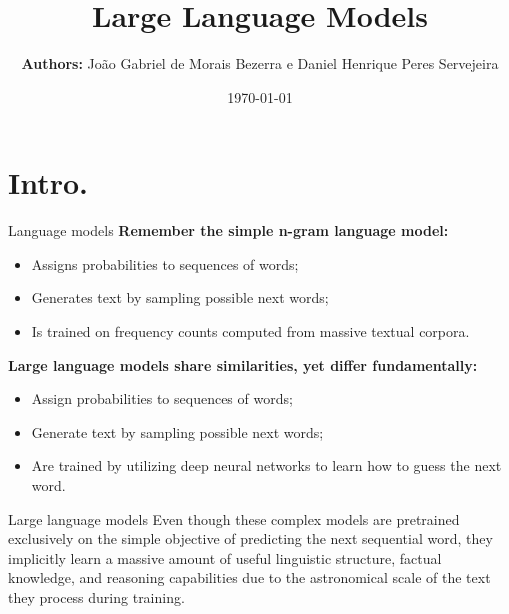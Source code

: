 \documentclass[aspectratio=169]{beamer}
\title[]{Large Language Models}
\author[Exame de Qualificação]{\textbf{Authors:} João Gabriel de Morais Bezerra e Daniel Henrique Peres Servejeira}%
\institute[]{Numerical Simulations and Artificial Intelligence Laboratory}
\date{\today}
\begin{document}
\begin{frame}
    \titlepage{}
\end{frame}
\section{Intro.}

\begin{frame}{Language models}\justifying
    \textbf{Remember the simple n-gram language model:}
    \begin{itemize}
        \item Assigns probabilities to sequences of words;
        \item Generates text by sampling possible next words;
        \item Is trained on frequency counts computed from massive textual corpora.
    \end{itemize}
    \vspace{0.5cm}
    \textbf{Large language models share similarities, yet differ fundamentally:}
    \begin{itemize}
        \item Assign probabilities to sequences of words;
        \item Generate text by sampling possible next words;
        \item Are trained by utilizing deep neural networks to learn how to guess the next word.
    \end{itemize}
\end{frame}

\begin{frame}{Large language models}\justifying
    Even though these complex models are pretrained exclusively on the simple objective of predicting the next sequential word, they implicitly learn a massive amount of useful linguistic structure, factual knowledge, and reasoning capabilities due to the astronomical scale of the text they process during training.
\end{frame}
\end{document}
